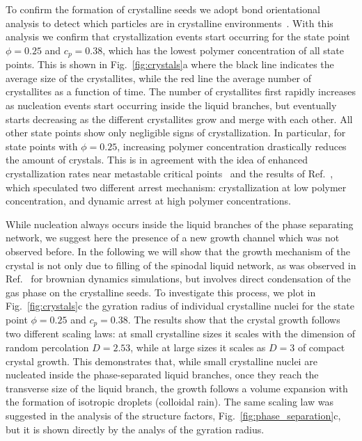 \documentclass[twocolumn,showpacs,amsmath,amssymb,pre,superscriptaddress]{revtex4}
\begin{document}
To confirm the formation of crystalline seeds we adopt bond orientational analysis to detect which particles are in crystalline environments~\cite{russo2012microscopic}. With this analysis we confirm that crystallization events start occurring for the state point $\phi=0.25$ and $c_p=0.38$, which has the lowest
polymer concentration of all state points. This is shown in Fig.~\ref{fig:crystals}a where the black line indicates the average size of the crystallites,
while the red line the average number of crystallites as a function of time. The number of crystallites first rapidly increases as nucleation events
start occurring inside the liquid branches, but eventually starts decreasing as the different crystallites grow and merge with each other.
All other state points show only negligible signs of crystallization. In particular, for state points with $\phi=0.25$, increasing
polymer concentration drastically reduces the amount of crystals. This is in agreement with the
idea of enhanced crystallization rates near metastable critical points~\cite{ten1997enhancement,olmsted1998spinodal} and the
results of Ref.~\cite{fortini2008crystallization,perez2011pathways},
which speculated two different arrest mechanism: crystallization at low polymer concentration, and dynamic arrest at high polymer concentrations.

While nucleation always occurs inside the liquid branches of the phase separating network, we suggest here the presence of a new growth channel
which was not observed before. In the following we will show that the growth mechanism of the crystal is not only due to filling of the spinodal liquid network, as was observed in Ref.~\cite{fortini2008crystallization,perez2011pathways} for brownian dynamics simulations, but involves direct condensation of the gas phase
on the crystalline seeds.
To investigate this process, we plot in Fig.~\ref{fig:crystals}c the gyration radius of individual crystalline nuclei for the state point
$\phi=0.25$ and $c_p=0.38$. The results show that the crystal growth follows two different scaling laws: at small crystalline sizes it scales with
the dimension of random percolation $D=2.53$, while at large sizes it scales as $D=3$ of compact crystal growth. This demonstrates that, while
small crystalline nuclei are nucleated inside the phase-separated liquid branches, once they reach the transverse size of the liquid branch, the growth
follows a volume expansion with the formation of isotropic droplets (colloidal rain). The same scaling law was suggested in the analysis of the
structure factors, Fig.~\ref{fig:phase_separation}c, but it is shown directly by the analys of the gyration radius.
\end{document}
